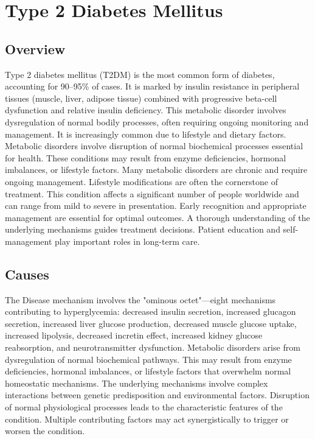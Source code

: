 \chapter{Type 2 Diabetes Mellitus}
\label{sec:Type 2 Diabetes Mellitus}

\section{Overview}
Type 2 diabetes mellitus (T2DM) is the most common form of diabetes, accounting for 90--95\% of cases. It is marked by insulin resistance in peripheral tissues (muscle, liver, adipose tissue) combined with progressive beta-cell dysfunction and relative insulin deficiency. This metabolic disorder involves dysregulation of normal bodily processes, often requiring ongoing monitoring and management. It is increasingly common due to lifestyle and dietary factors. Metabolic disorders involve disruption of normal biochemical processes essential for health. These conditions may result from enzyme deficiencies, hormonal imbalances, or lifestyle factors. Many metabolic disorders are chronic and require ongoing management. Lifestyle modifications are often the cornerstone of treatment. This condition affects a significant number of people worldwide and can range from mild to severe in presentation. Early recognition and appropriate management are essential for optimal outcomes. A thorough understanding of the underlying mechanisms guides treatment decisions. Patient education and self-management play important roles in long-term care.
\section{Causes}
The Disease mechanism involves the "ominous octet"---eight mechanisms contributing to hyperglycemia: decreased insulin secretion, increased glucagon secretion, increased liver glucose production, decreased muscle glucose uptake, increased lipolysis, decreased incretin effect, increased kidney glucose reabsorption, and neurotransmitter dysfunction. Metabolic disorders arise from dysregulation of normal biochemical pathways. This may result from enzyme deficiencies, hormonal imbalances, or lifestyle factors that overwhelm normal homeostatic mechanisms. The underlying mechanisms involve complex interactions between genetic predisposition and environmental factors. Disruption of normal physiological processes leads to the characteristic features of the condition. Multiple contributing factors may act synergistically to trigger or worsen the condition.
